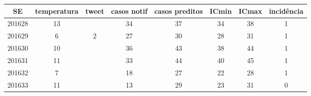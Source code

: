 \begin{tabular}{c|ccccccc}
  \hline
SE & temperatura & tweet & casos notif & casos preditos & ICmin & ICmax & incidência \\ 
  \hline
201628 & 13 &  & 34 & 37 & 34 & 38 & 1 \\ 
  201629 & 6 & 2 & 27 & 30 & 28 & 31 & 1 \\ 
  201630 & 10 &  & 36 & 43 & 38 & 44 & 1 \\ 
  201631 & 11 &  & 33 & 44 & 40 & 45 & 1 \\ 
  201632 & 7 &  & 18 & 27 & 22 & 28 & 1 \\ 
  201633 & 11 &  & 13 & 29 & 23 & 31 & 0 \\ 
   \hline
\end{tabular}
